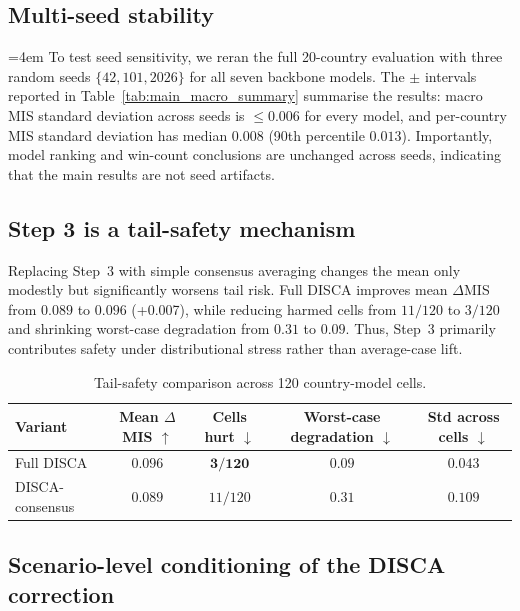 \documentclass{article}
\begin{document}
\subsection{Multi-seed stability}
\label{sec:multiseed}

{\sloppy\emergencystretch=4em
To test seed sensitivity, we reran the full 20-country evaluation with three random seeds $\{42,101,2026\}$ for all seven backbone models. The $\pm$ intervals reported in Table~\ref{tab:main_macro_summary} summarise the results: macro MIS standard deviation across seeds is $\leq 0.006$ for every model, and per-country MIS standard deviation has median $0.008$ (90th percentile $0.013$). Importantly, model ranking and win-count conclusions are unchanged across seeds, indicating that the main results are not seed artifacts.\par}

\subsection{Step 3 is a tail-safety mechanism}
\label{sec:tail_safety}

Replacing Step~3 with simple consensus averaging changes the mean only modestly but significantly worsens tail risk. Full DISCA improves mean $\Delta$MIS from $0.089$ to $0.096$ (+0.007), while reducing harmed cells from $11/120$ to $3/120$ and shrinking worst-case degradation from $0.31$ to $0.09$. Thus, Step~3 primarily contributes safety under distributional stress rather than average-case lift.

\begin{table}[H]
\centering\small
\caption{Tail-safety comparison across 120 country-model cells.}
\label{tab:tail_safety}
\begin{tabular}{lcccc}
\toprule
Variant & Mean $\Delta$MIS $\uparrow$ & Cells hurt $\downarrow$ & Worst-case degradation $\downarrow$ & Std across cells $\downarrow$ \\
\midrule
Full DISCA      & $\mathbf{0.096}$ & $\mathbf{3/120}$  & $\mathbf{0.09}$ & $\mathbf{0.043}$ \\
DISCA-consensus & $0.089$          & $11/120$          & $0.31$          & $0.109$ \\
\bottomrule
\end{tabular}
\end{table}

\subsection{Scenario-level conditioning of the DISCA correction}
\label{sec:scenario_disagreement_correction}
\end{document}
